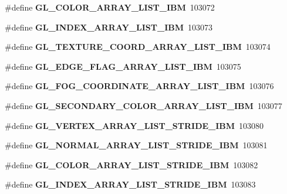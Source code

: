 \begin{DoxyCompactItemize}
\item 
\#define {\bfseries G\+L\+\_\+\+C\+O\+L\+O\+R\+\_\+\+A\+R\+R\+A\+Y\+\_\+\+L\+I\+S\+T\+\_\+\+I\+B\+M}~103072\label{_s_d_l__opengl_8h_a229a2525a705825ba39bc2d5e676a113}

\item 
\#define {\bfseries G\+L\+\_\+\+I\+N\+D\+E\+X\+\_\+\+A\+R\+R\+A\+Y\+\_\+\+L\+I\+S\+T\+\_\+\+I\+B\+M}~103073\label{_s_d_l__opengl_8h_af3bcf9acb8c6e1ba50f13a9372c5b7b1}

\item 
\#define {\bfseries G\+L\+\_\+\+T\+E\+X\+T\+U\+R\+E\+\_\+\+C\+O\+O\+R\+D\+\_\+\+A\+R\+R\+A\+Y\+\_\+\+L\+I\+S\+T\+\_\+\+I\+B\+M}~103074\label{_s_d_l__opengl_8h_acff3e2f228e19c5dc24c4047adafc58a}

\item 
\#define {\bfseries G\+L\+\_\+\+E\+D\+G\+E\+\_\+\+F\+L\+A\+G\+\_\+\+A\+R\+R\+A\+Y\+\_\+\+L\+I\+S\+T\+\_\+\+I\+B\+M}~103075\label{_s_d_l__opengl_8h_a7dd06e299288ea4963676e62a676fe46}

\item 
\#define {\bfseries G\+L\+\_\+\+F\+O\+G\+\_\+\+C\+O\+O\+R\+D\+I\+N\+A\+T\+E\+\_\+\+A\+R\+R\+A\+Y\+\_\+\+L\+I\+S\+T\+\_\+\+I\+B\+M}~103076\label{_s_d_l__opengl_8h_adbaeded59bfc1cc920d0ee176722b389}

\item 
\#define {\bfseries G\+L\+\_\+\+S\+E\+C\+O\+N\+D\+A\+R\+Y\+\_\+\+C\+O\+L\+O\+R\+\_\+\+A\+R\+R\+A\+Y\+\_\+\+L\+I\+S\+T\+\_\+\+I\+B\+M}~103077\label{_s_d_l__opengl_8h_a88d1278170e87f5e41a833b3dfedc156}

\item 
\#define {\bfseries G\+L\+\_\+\+V\+E\+R\+T\+E\+X\+\_\+\+A\+R\+R\+A\+Y\+\_\+\+L\+I\+S\+T\+\_\+\+S\+T\+R\+I\+D\+E\+\_\+\+I\+B\+M}~103080\label{_s_d_l__opengl_8h_afe4a441260879aa79c6d9945bb9443dd}

\item 
\#define {\bfseries G\+L\+\_\+\+N\+O\+R\+M\+A\+L\+\_\+\+A\+R\+R\+A\+Y\+\_\+\+L\+I\+S\+T\+\_\+\+S\+T\+R\+I\+D\+E\+\_\+\+I\+B\+M}~103081\label{_s_d_l__opengl_8h_ab06062b6136558e835065c1763ee65af}

\item 
\#define {\bfseries G\+L\+\_\+\+C\+O\+L\+O\+R\+\_\+\+A\+R\+R\+A\+Y\+\_\+\+L\+I\+S\+T\+\_\+\+S\+T\+R\+I\+D\+E\+\_\+\+I\+B\+M}~103082\label{_s_d_l__opengl_8h_a9e485172931c748f3e7d7102abca1a65}

\item 
\#define {\bfseries G\+L\+\_\+\+I\+N\+D\+E\+X\+\_\+\+A\+R\+R\+A\+Y\+\_\+\+L\+I\+S\+T\+\_\+\+S\+T\+R\+I\+D\+E\+\_\+\+I\+B\+M}~103083\label{_s_d_l__opengl_8h_a5a2e1038ed023481d58b30d650f8a520}


\end{DoxyCompactItemize}
